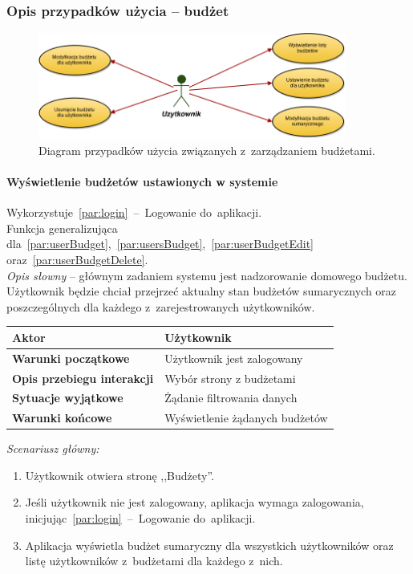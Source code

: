 \subsubsection{Opis przypadków użycia -- budżet}

\begin{figure}[H]
  \centering
  \includegraphics[width=0.9\textwidth]{images/budgets_use_cases.png}
  \caption{Diagram przypadków użycia związanych z~zarządzaniem budżetami.}
\end{figure}

\paragraph{Wyświetlenie budżetów ustawionych w systemie\newline}
\label{par:budgetsList}
Wykorzystuje~\ref{par:login}~--~Logowanie do~aplikacji.\\
\indent Funkcja generalizująca dla~\ref{par:userBudget},~\ref{par:usersBudget},~\ref{par:userBudgetEdit} oraz~\ref{par:userBudgetDelete}.\\

\textit{Opis słowny} -- głównym zadaniem systemu jest nadzorowanie domowego budżetu. Użytkownik będzie chciał przejrzeć aktualny stan budżetów sumarycznych oraz poszczególnych dla każdego z~zarejestrowanych użytkowników.

\begin{longtable}{|p{5cm}|p{7cm}|}
  \hline \textbf{Aktor} & Użytkownik \\
  \hline \textbf{Warunki początkowe} & Użytkownik jest zalogowany \\
  \hline \textbf{Opis przebiegu interakcji} & Wybór strony z budżetami \\
  \hline \textbf{Sytuacje wyjątkowe} & Żądanie filtrowania danych \\
  \hline \textbf{Warunki końcowe} & Wyświetlenie żądanych budżetów \\
  \hline
\end{longtable}

\noindent \textit{Scenariusz główny:}
\begin{enumerate}
  \item Użytkownik otwiera stronę ,,Budżety''.
  \item Jeśli użytkownik nie jest zalogowany, aplikacja wymaga zalogowania, inicjując~\ref{par:login}~--~Logowanie do~aplikacji.
  \item Aplikacja wyświetla budżet sumaryczny dla wszystkich użytkowników oraz listę użytkowników z~budżetami dla każdego z~nich.
\end{enumerate}

